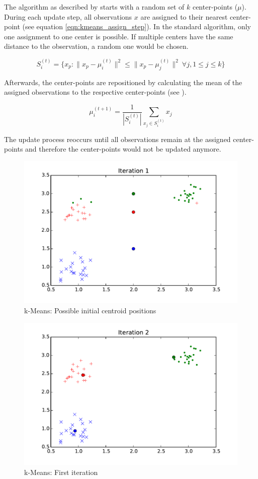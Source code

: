  The algorithm as described by \cite{kmeans} starts with a random set of $k$ center-points ($\mu$). During each update step, all observations $x$ are assigned to their nearest center-point (see equation \ref{eqn:kmeans_assign_step}). In the standard algorithm, only one assignment to one center is possible. If multiple centers have the same distance to the observation, a random one would be chosen.

\begin{equation}
S_i^{(t)} = \big \{ x_p : \big \| x_p - \mu^{(t)}_i \big \|^2 \le \big \| x_p - \mu^{(t)}_j \big \|^2 \ \forall j, 1 \le j \le k \big\}
\label{eqn:kmeans_assign_step}
\end{equation}

Afterwards, the center-points are repositioned by calculating the mean of the assigned observations to the respective center-points (see ).

\begin{equation}
\mu^{(t+1)}_i = \frac{1}{|S^{(t)}_i|} \sum_{x_j \in S^{(t)}_i} x_j
\label{eqn:kmeans_update_step}
\end{equation}

The update process reoccurs until all observations remain at the assigned center-points and therefore the center-points would not be updated anymore.


\begin{figure}
\centering
\includegraphics[width=0.4\linewidth]{img/iteration01}
\caption{k-Means: Possible initial centroid positions}
\label{fig:kmeans:iteration01}
\end{figure}

\begin{figure}
\centering
\includegraphics[width=0.4\linewidth]{img/iteration02}
\caption{k-Means: First iteration}
\label{fig:kmeans:iteration02}
\end{figure}

